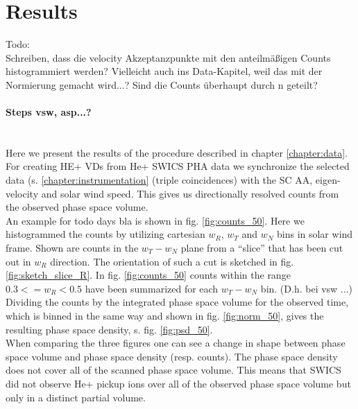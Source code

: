 
\chapter{Results} %
\label{chap:results}



%
%
%
Todo:\\
Schreiben, dass die velocity Akzeptanzpunkte mit den anteilmäßigen Counts histogrammiert werden? Vielleicht auch ins Data-Kapitel, weil das mit der Normierung gemacht wird...? Sind die Counts überhaupt durch n geteilt?\\ \\
\textbf{Steps vsw, asp...?}
\\ \\ \\
Here we present the results of the procedure described in chapter \ref{chapter:data}. For creating HE+ VDs from He+ SWICS PHA data we synchronize the selected data (s. \ref{chapter:instrumentation} (triple coincidences) with the SC AA, eigen-velocity and solar wind speed.
This gives us directionally resolved counts from the observed phase space volume.
\\
An example for todo days bla is shown in fig. \ref{fig:counts_50}. Here we histogrammed the counts by utilizing cartesian $w_R$, $w_T$ and $w_N$ bins in solar wind frame. Shown are counts in the $w_T - w_N$ plane from a ``slice'' that has been cut out in $w_R$ direction. The orientation of such a cut is sketched in fig. \ref{fig:sketch_slice_R}. In fig. \ref{fig:counts_50} counts within the range $0.3 <= w_R < 0.5$ have been summarized for each $w_T - w_N$ bin.
(D.h. bei vsw ...)
\\
Dividing the counts by the integrated phase space volume for the observed time, which is binned in the same way and shown in fig. \ref{fig:norm_50}, gives the resulting phase space density, s. fig. \ref{fig:psd_50}.\\
When comparing the three figures one can see a change in shape between phase space volume and phase space density (resp. counts). The phase space density does not cover all of the scanned phase space volume. This means that SWICS did not observe He+ pickup ions over all of the observed phase space volume but only in a distinct partial volume.\\ 
